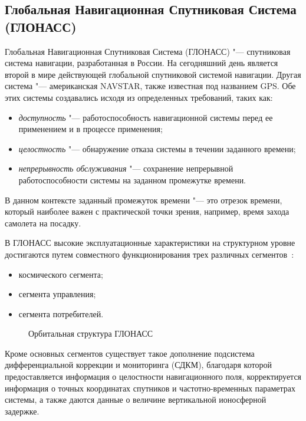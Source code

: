 \documentclass[../main.tex]{subfiles}
\begin{document}
\subsection{Глобальная Навигационная Спутниковая Система (ГЛОНАСС)}
Глобальная Навигационная Спутниковая Система (ГЛОНАСС) "--- спутниковая система навигации, разработанная в России. На сегодняшний день является второй в мире действующей глобальной спутниковой системой навигации. Другая система "--- американская NAVSTAR, также известная под названием GPS. Обе этих системы создавались исходя из определенных требований, таких как:
\begin{itemize}
    \item \textit{доступность} "--- работоспособность навигационной системы перед ее применением и в процессе применения;
    \item \textit{целостность} "--- обнаружение отказа системы в течении заданного времени;
    \item \textit{непрерывность обслуживания} "--- сохранение непрерывной работоспособности системы на заданном промежутке времени.
\end{itemize}
В данном контексте заданный промежуток времени "--- это отрезок времени, который наиболее важен с практической точки зрения, например, время захода самолета на посадку.

В ГЛОНАСС высокие эксплуатационные характеристики на структурном уровне достигаются путем совместного функционирования трех различных сегментов~\cite{YATSENKOV:2005}:
\begin{itemize}
    \item космического сегмента;
    \item сегмента управления;
    \item сегмента потребителей.
\end{itemize}

\begin{figure}[tb]
    \begin{center}


    \caption{Орбитальная структура ГЛОНАСС}
    \label{fig:glonass:pic1}
    \end{center}
\end{figure}

Кроме основных сегментов существует такое дополнение подсистема дифференциальной коррекции и мониторинга (СДКМ), благодаря которой предоставляется информация о целостности навигационного поля, корректируется информация о точных координатах спутников и частотно-временных параметрах системы, а также даются данные о величине вертикальной ионосферной задержке.
\end{document}
